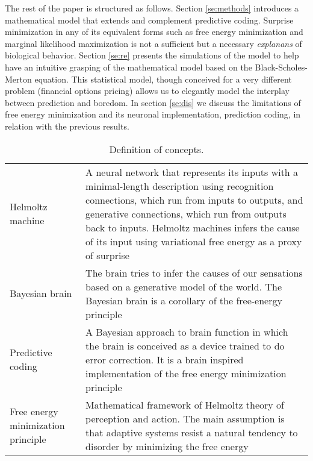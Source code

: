 \documentclass[11pt, onecolumn]{article}
\begin{document}
The rest of the paper is structured as follows. Section \ref{se:methods} introduces a mathematical model that extends and complement predictive coding. Surprise minimization in any of its equivalent forms such as free energy minimization and marginal likelihood maximization is not a sufficient but a necessary \emph{explanans} of biological behavior. Section \ref{se:re} presents the simulations of the model to help have an intuitive grasping of the mathematical model based on the Black-Scholes-Merton equation. This statistical model, though conceived for a very different problem (financial options pricing) allows us to elegantly model the interplay between prediction and boredom.
In section \ref{se:dis} we discuss the limitations of free energy minimization and its neuronal implementation, prediction coding, in relation with the previous results.
\begin{table}[H]
\centering
\caption{Definition of concepts.}\label{tab:multi row}
\begin{tabular}{p{7cm}p{7cm}}
\hline
 & \\
\hline
Helmoltz machine&A neural network that represents its inputs with a minimal-length description using recognition connections, which run from inputs to outputs, and generative connections, which run from outputs back to inputs. Helmoltz machines infers the cause of its input using variational free energy as a proxy of  surprise
\\
Bayesian brain & The brain tries to infer the causes of our sensations based on a generative model of the world. The Bayesian brain is a corollary of the free-energy principle \\
Predictive coding& A Bayesian approach to brain function in which the brain is conceived as a device trained to do error correction. It is a brain inspired implementation of the free energy minimization principle  \\
Free energy minimization principle& Mathematical framework of Helmoltz theory of perception and action. The main assumption is that adaptive
systems resist a natural tendency to disorder by minimizing the free energy

\\
\hline
\end{tabular}
\end{table}%
\end{document}
